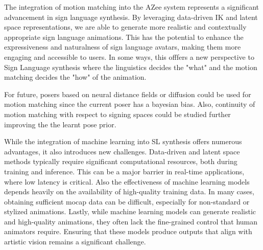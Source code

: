 \documentclass[../../main.tex]{subfiles}
\begin{document}
The integration of motion matching into the AZee system represents a significant advancement in sign language synthesis. By leveraging data-driven IK and latent space representations, we are able to generate more realistic and contextually appropriate sign language animations. This has the potential to enhance the expressiveness and naturalness of sign language avatars, making them more engaging and accessible to users. In some ways, this offfers a new perspective to Sign Language synthesis where the linguistics decides the "what" and the motion matching decides the "how" of the animation.

For future, posers based on neural distance fields \cite{tiwari2022pose} or diffusion \cite{lu2023dposer} could be used for motion matching since the current poser has a bayesian bias. Also, continuity of motion matching with respect to signing spaces could be studied further improving the the learnt pose prior.

While the integration of machine learning into SL synthesis offers numerous advantages, it also introduces new challenges. Data-driven and latent space methods typically require significant computational resources, both during training and inference. This can be a major barrier in real-time applications, where low latency is critical. Also the effectiveness of machine learning models depends heavily on the availability of high-quality training data. In many cases, obtaining sufficient mocap data can be difficult, especially for non-standard or stylized animations. Lastly, while machine learning models can generate realistic and high-quality animations, they often lack the fine-grained control that human animators require. Ensuring that these models produce outputs that align with artistic vision remains a significant challenge.
\end{document}
